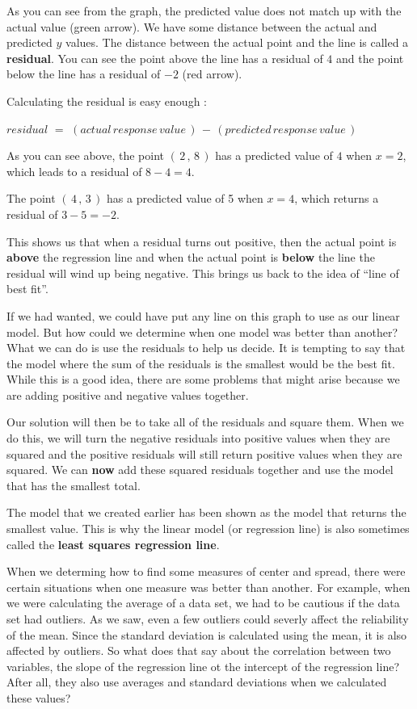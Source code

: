 \documentclass[
  letterpaper,
  DIV=11,
  numbers=noendperiod]{scrreprt}
\begin{document}
As you can see from the graph, the predicted value does not match up
with the actual value (green arrow). We have some distance between the
actual and predicted \(y\) values. The distance between the actual point
and the line is called a \textbf{residual}. You can see the point above
the line has a residual of \(4\) and the point below the line has a
residual of \(-2\) (red arrow).

Calculating the residual is easy enough :

\(residual \,\, = \,\, (actual \, response\, value\,) \, - \, (predicted
\, response\, value \,)\)

As you can see above, the point \((\,2\, , \,8\,)\) has a predicted
value of \(4\) when \(x=2\), which leads to a residual of \(8-4 =4\).

The point \((\,4\, , \, 3 \,)\) has a predicted value of 5 when \(x=4\),
which returns a residual of \(3 - 5 = -2\).

This shows us that when a residual turns out positive, then the actual
point is \textbf{above} the regression line and when the actual point is
\textbf{below} the line the residual will wind up being negative. This
brings us back to the idea of ``line of best fit''.

If we had wanted, we could have put any line on this graph to use as our
linear model. But how could we determine when one model was better than
another? What we can do is use the residuals to help us decide. It is
tempting to say that the model where the sum of the residuals is the
smallest would be the best fit. While this is a good idea, there are
some problems that might arise because we are adding positive and
negative values together.

Our solution will then be to take all of the residuals and square them.
When we do this, we will turn the negative residuals into positive
values when they are squared and the positive residuals will still
return positive values when they are squared. We can \textbf{now} add
these squared residuals together and use the model that has the smallest
total.

The model that we created earlier has been shown as the model that
returns the smallest value. This is why the linear model (or regression
line) is also sometimes called the \textbf{least squares regression
line}.

When we determing how to find some measures of center and spread, there
were certain situations when one measure was better than another. For
example, when we were calculating the average of a data set, we had to
be cautious if the data set had outliers. As we saw, even a few outliers
could severly affect the reliability of the mean. Since the standard
deviation is calculated using the mean, it is also affected by outliers.
So what does that say about the correlation between two variables, the
slope of the regression line ot the intercept of the regression line?
After all, they also use averages and standard deviations when we
calculated these values?
\end{document}
